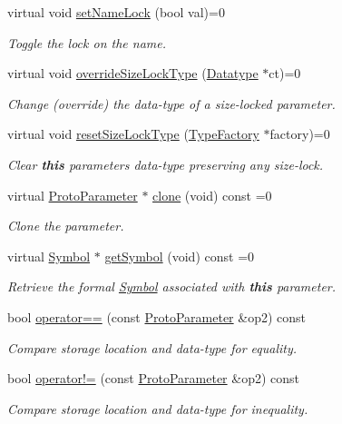 \begin{DoxyCompactItemize}
virtual void \mbox{\hyperlink{class_proto_parameter_ac444ad9eb331af2d5a72d1f1ef1250ae}{set\+Name\+Lock}} (bool val)=0
\begin{DoxyCompactList}\small\item\em Toggle the lock on the name. \end{DoxyCompactList}\item 
virtual void \mbox{\hyperlink{class_proto_parameter_a05418aa9f8e8fa0c7499b99cd51e24d3}{override\+Size\+Lock\+Type}} (\mbox{\hyperlink{class_datatype}{Datatype}} $\ast$ct)=0
\begin{DoxyCompactList}\small\item\em Change (override) the data-\/type of a {\itshape size-\/locked} parameter. \end{DoxyCompactList}\item 
virtual void \mbox{\hyperlink{class_proto_parameter_a15d92b3da7ab6b1cd6cf52dea6ee2978}{reset\+Size\+Lock\+Type}} (\mbox{\hyperlink{class_type_factory}{Type\+Factory}} $\ast$factory)=0
\begin{DoxyCompactList}\small\item\em Clear {\bfseries{this}} parameter\textquotesingle{}s data-\/type preserving any {\itshape size-\/lock}. \end{DoxyCompactList}\item 
virtual \mbox{\hyperlink{class_proto_parameter}{Proto\+Parameter}} $\ast$ \mbox{\hyperlink{class_proto_parameter_a3f09d39a3c5f10b368753eaa0391bea8}{clone}} (void) const =0
\begin{DoxyCompactList}\small\item\em Clone the parameter. \end{DoxyCompactList}\item 
virtual \mbox{\hyperlink{class_symbol}{Symbol}} $\ast$ \mbox{\hyperlink{class_proto_parameter_afb4a7192eb2e8449b47d85073b3d82e6}{get\+Symbol}} (void) const =0
\begin{DoxyCompactList}\small\item\em Retrieve the formal \mbox{\hyperlink{class_symbol}{Symbol}} associated with {\bfseries{this}} parameter. \end{DoxyCompactList}\item 
bool \mbox{\hyperlink{class_proto_parameter_a61ce8ecb7464780b491a8e1ceb7144e8}{operator==}} (const \mbox{\hyperlink{class_proto_parameter}{Proto\+Parameter}} \&op2) const
\begin{DoxyCompactList}\small\item\em Compare storage location and data-\/type for equality. \end{DoxyCompactList}\item 
bool \mbox{\hyperlink{class_proto_parameter_a82ceb5d7de4394d1e0760bc38a78fe0c}{operator!=}} (const \mbox{\hyperlink{class_proto_parameter}{Proto\+Parameter}} \&op2) const
\begin{DoxyCompactList}\small\item\em Compare storage location and data-\/type for inequality. \end{DoxyCompactList}\end{DoxyCompactItemize}


